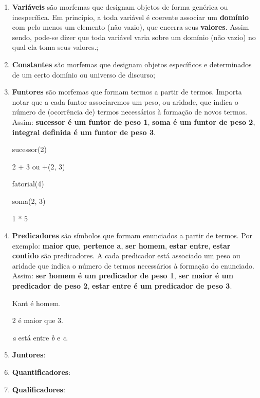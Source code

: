 \begin{enumerate}[label=\arabic*)]
    \item \textbf{Variáveis} são morfemas que designam objetos de forma genérica ou inespecífica.
    Em princípio, a toda variável é coerente associar um \textbf{domínio} com pelo menos um elemento (não vazio), que encerra seus \textbf{valores}.
    Assim sendo, pode-se dizer que toda variável varia sobre um domínio (não vazio) no qual ela toma seus valores.;

    \item \textbf{Constantes} são morfemas que designam objetos específicos e determinados de um certo domínio ou universo de discurso;

    \item \textbf{Funtores} são morfemas que formam termos a partir de termos.
    Importa notar que a cada funtor associaremos um peso, ou aridade, que indica o número de (ocorrência de) termos necessários à formação de novos termos.
    Assim: \textbf{sucessor é um funtor de peso 1}, \textbf{soma é um funtor de peso 2}, \textbf{integral definida é um funtor de peso 3}.

    \begin{exemplo}
            sucessor(2)
    \end{exemplo}
    \begin{exemplo}
            2 + 3 ou +(2, 3)
    \end{exemplo}
    \begin{exemplo}
            fatorial(4)
    \end{exemplo}
    \begin{exemplo}
            soma(2, 3)
    \end{exemplo}
    \begin{exemplo}
            1 * 5
    \end{exemplo}

    \item \textbf{Predicadores} são símbolos que formam enunciados a partir de termos.
    Por exemplo: \textbf{maior que}, \textbf{pertence a}, \textbf{ser homem}, \textbf{estar entre}, \textbf{estar contido} são predicadores.
    A cada predicador está associado um peso ou aridade que indica o número de termos necessários à formação do enunciado.
    Assim: \textbf{ser homem é um predicador de peso 1}, \textbf{ser maior é um predicador de peso 2}, \textbf{estar entre é um predicador de peso 3}.

    \begin{exemplo}
        Kant é homem.
    \end{exemplo}
    \begin{exemplo}
        2 é maior que 3.
    \end{exemplo}
    \begin{exemplo}
        \textit{a} está entre \textit{b} e \textit{c}.
    \end{exemplo}


    \item \textbf{Juntores}:
    \item \textbf{Quantificadores}:
    \item \textbf{Qualificadores}:
\end{enumerate}
